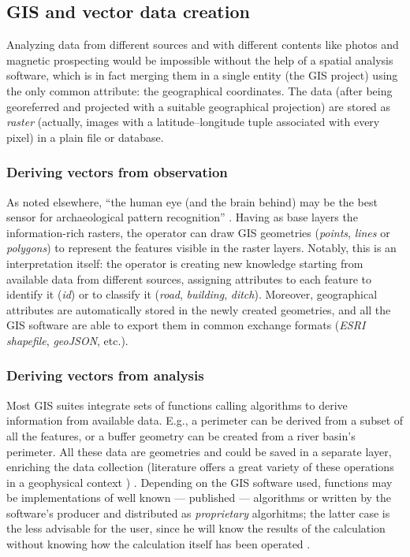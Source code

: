         \subsection{GIS and vector data creation}
            Analyzing data from different sources and with different contents like photos and magnetic prospecting would be impossible without the help of a spatial analysis software, which is in fact merging them in a single entity (the GIS project) using the only common attribute: the geographical coordinates. The data (after being georeferred and projected with a suitable geographical projection) are stored as \emph{raster} (actually, images with a latitude--longitude tuple associated with every pixel) in a plain file or database.\\

            \subsubsection{Deriving vectors from observation}
                As noted elsewhere, ``the human eye (and the brain behind) may be the best sensor for archaeological pattern recognition'' \cite[p.~164]{becker}. Having as base layers the information-rich rasters, the operator can draw GIS geometries (\emph{points}, \emph{lines} or \emph{polygons}) to represent the features visible in the raster layers. Notably, this is an interpretation itself: the operator is creating new knowledge starting from available data from different sources, assigning attributes to each feature to identify it (\emph{id}) or to classify it (\emph{road}, \emph{building}, \emph{ditch}). Moreover, geographical attributes are automatically stored in the newly created geometries, and all the GIS software are able to export them in common exchange formats (\emph{ESRI shapefile}, \emph{geoJSON}, etc.).

            \subsubsection{Deriving vectors from analysis}
                Most GIS suites integrate sets of functions calling algorithms to derive information from available data. E.g., a perimeter can be derived from a subset of all the features, or a buffer geometry can be created from a river basin's perimeter. All these data are geometries and could be saved in a separate layer, enriching the data collection (literature offers a great variety of these operations in a geophysical context \cite[p.~325]{remote-ciminale})
                . Depending on the GIS software used, functions may be implementations of well known --- published --- algorithms or written by the software's producer and distributed as \emph{proprietary} algorhitms; the latter case is the less advisable for the user, since he will know the results of the calculation without knowing how the calculation itself has been operated \cite[p.~69]{fronza-informatica}.

